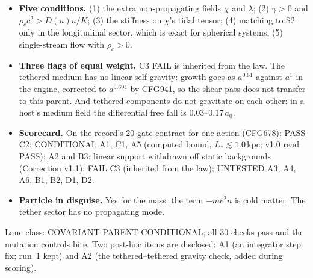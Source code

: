 \documentclass[10pt]{article}
\begin{document}
\begin{itemize}
\item \textbf{Five conditions.} (1) the extra non-propagating fields $\chi$ and $\lambda$; (2) $\gamma>0$ and $\rho_cc^2>D(u)u/K$; (3) the stiffness on $\chi$'s tidal tensor; (4) matching to S2 only in the longitudinal sector, which is exact for spherical systems; (5) single-stream flow with $\rho_c>0$.
\item \textbf{Three flags of equal weight.} C3 FAIL is inherited from the law. The tethered medium has no linear self-gravity: growth goes as $a^{0.61}$ against $a^1$ in the engine, corrected to $a^{0.694}$ by CFG941, so the shear pass does not transfer to this parent. And tethered components do not gravitate on each other: in a host's medium field the differential free fall is 0.03--0.17\,$a_0$.
\item \textbf{Scorecard.} On the record's 20-gate contract for one action (CFG678): PASS C2; CONDITIONAL A1, C1, A5 (computed bound, $L_*\lesssim1.0$\,kpc; v1.0 read PASS); A2 and B3: linear support withdrawn off static backgrounds (Correction v1.1); FAIL C3 (inherited from the law); UNTESTED A3, A4, A6, B1, B2, D1, D2.
\item \textbf{Particle in disguise.} Yes for the mass: the term $-mc^2n$ is cold matter. The tether sector has no propagating mode.
\end{itemize}
Lane class: COVARIANT PARENT CONDITIONAL; all 30 checks pass and the mutation controls bite. Two post-hoc items are disclosed: A1 (an integrator step fix; run~1 kept) and A2 (the tethered--tethered gravity check, added during scoring).
\end{document}
